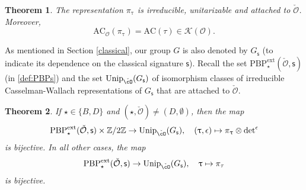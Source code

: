 \documentclass[12pt,a4paper]{amsart}
\newcommand{\CK}{{\mathcal {K}}}
\newcommand{\CO}{{\mathcal {O}}}
\newcommand{\Z}{\mathbb{Z}}
\newcommand{\be}{\begin {equation}}
\newcommand{\ee}{\end {equation}}
\numberwithin{equation}{section}
\newtheorem{thm}{Theorem}[section]
\theoremstyle{remark}
\def\Unip{\mathrm{Unip}}
\def\PBPe{\mathrm{PBP}^{\mathrm{ext}}}
\begin{document}
\begin{thm}\label{thmpitau}
The representation $\pi_\uptau$ is irreducible, unitarizable and attached to $\check \CO$. Moreover,
\[
\mathrm{AC}_\CO(\pi_\uptau)=\mathrm{AC}(\tau)\in \CK(\CO).
\]
\end{thm}

As mentioned in Section \ref{classical}, our group $G$ is also denoted by $G_\mathsf s$ (to indicate its dependence on the classical signature $\mathsf s$). Recall the set $\PBPe_\star(\check \CO,\mathsf s)$ (in \eqref{def:PBPs}) and the set $\Unip_{\check \cO}(G_\mathsf s)$ of isomorphism classes of irreducible Casselman-Wallach representations of $G_\mathsf s$ that are attached to $\check \CO$.

\begin{thm}\label{thmac7}
If $\star\in \{B,D\}$ and $(\star, \check \CO)\neq (D, \emptyset)$, then  the map
\be\label{bijthm1}
 \PBPe_\star(\check \CO,\mathsf s)\times \Z/2\Z \rightarrow \Unip_{\check \cO}(G_\mathsf s),\quad (\uptau, \epsilon)\mapsto \pi_\uptau\otimes {\det}^{\epsilon}
\ee
is bijective. In all other cases, the
map
\be\label{bijthm2}
\PBPe_\star(\check \CO,\mathsf s)\rightarrow \Unip_{\check \cO}(G_\mathsf s), \quad \uptau\mapsto \pi_\tau
\ee
is bijective.
\end{thm}
\end{document}

